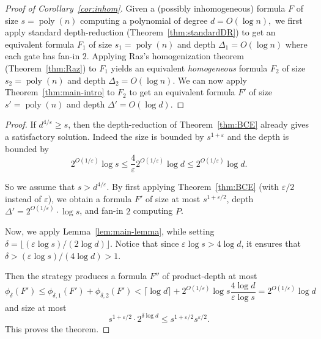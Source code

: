 \documentclass[10pt,a4paper]{article}
\newcommand{\poly}{\mathop{\mathrm{poly}}}
\newcommand{\comment}[2]{\marginpar{\tiny{\textbf{#1: }\textit{#2}}}}
\newcommand{\gm}[1]{\comment{GM}{#1}}
\begin{document}
\begin{proof}[Proof of Corollary~\ref{cor:inhom}]
	Given a (possibly inhomogeneous) formula $F$ of size $s = \poly(n)$ computing a polynomial of degree $d = O(\log n),$ we first apply standard depth-reduction (Theorem~\ref{thm:standardDR}) to get an equivalent formula $F_1$ of size $s_1 = \poly(n)$ and depth $\Delta_1 = O(\log n)$ where each gate has fan-in $2$. Applying Raz's homogenization theorem (Theorem~\ref{thm:Raz}) to $F_1$ yields an equivalent \emph{homogeneous} formula $F_2$ of size $s_2 = \poly(n)$ and depth $\Delta_2 = O(\log n)$. We can now apply Theorem~\ref{thm:main-intro} to $F_2$ to get an equivalent formula $F'$ of size $s' = \poly(n)$ and depth $\Delta' = O(\log d).$
\end{proof}

\begin{proof}
	If \(d^{4/\varepsilon} \geq s\), then the depth-reduction of Theorem~\ref{thm:BCE} already gives a satisfactory solution. Indeed the size is bounded by \(s^{1+\varepsilon}\) and the depth is bounded by
	\[
	2^{O(1/\varepsilon)} \log s \leq \frac{4}{\varepsilon} 2^{O(1/\varepsilon)}\log d \leq 2^{O(1/\varepsilon)} \log d.
	\]
	
	So we assume that \(s > d^{4/\varepsilon}\). By first applying Theorem~\ref{thm:BCE} (with $\varepsilon/2$ instead of $\varepsilon$), we obtain a formula $F'$ of size at most $s^{1+\varepsilon/2}$, depth $\Delta' = 2^{O(1/\varepsilon)}\cdot \log s$, and fan-in $2$ computing $P$.
	
	Now, we apply Lemma~\ref{lem:main-lemma}, while setting \(\delta = \lfloor {(\varepsilon \log s)}/{(2 \log d)} \rfloor\). 	 
	Notice that since \(\varepsilon \log s > 4 \log d\), it ensures that \(\delta  > (\varepsilon \log s)/(4 \log d) > 1\). 
	
	
	
	Then the strategy produces a formula $F''$ of product-depth at most
	\[
	\phi_\delta(F')\leq \phi_{\delta,1}(F') + \phi_{\delta,2}(F') <
	\lceil\log d\rceil + 2^{O(1/\varepsilon)}\log s \frac{4 \log d}{\varepsilon \log s} = 2^{O(1/\varepsilon)}\log d
	\]
	and size at most 
	\[
	s^{1+\varepsilon/2}\cdot 2^{\delta \log d} \leq s^{1+\varepsilon/2} s^{\varepsilon/2}.
	\]
	This proves the theorem.	
\end{proof}
\end{document}
